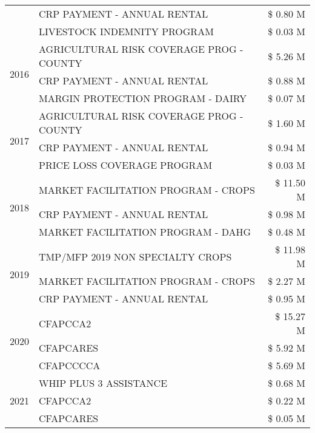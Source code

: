 \begin{tabular}{llr}
 & CRP PAYMENT - ANNUAL RENTAL & \$ 0.80 M \\
 & LIVESTOCK INDEMNITY PROGRAM & \$ 0.03 M \\
\cline{1-3}
\multirow[t]{3}{*}{2016} & AGRICULTURAL RISK COVERAGE PROG - COUNTY & \$ 5.26 M \\
 & CRP PAYMENT - ANNUAL RENTAL & \$ 0.88 M \\
 & MARGIN PROTECTION PROGRAM - DAIRY & \$ 0.07 M \\
\cline{1-3}
\multirow[t]{3}{*}{2017} & AGRICULTURAL RISK COVERAGE PROG - COUNTY & \$ 1.60 M \\
 & CRP PAYMENT - ANNUAL RENTAL & \$ 0.94 M \\
 & PRICE LOSS COVERAGE PROGRAM & \$ 0.03 M \\
\cline{1-3}
\multirow[t]{3}{*}{2018} & MARKET FACILITATION PROGRAM - CROPS & \$ 11.50 M \\
 & CRP PAYMENT - ANNUAL RENTAL & \$ 0.98 M \\
 & MARKET FACILITATION PROGRAM - DAHG & \$ 0.48 M \\
\cline{1-3}
\multirow[t]{3}{*}{2019} & TMP/MFP 2019 NON SPECIALTY CROPS & \$ 11.98 M \\
 & MARKET FACILITATION PROGRAM - CROPS & \$ 2.27 M \\
 & CRP PAYMENT - ANNUAL RENTAL & \$ 0.95 M \\
\cline{1-3}
\multirow[t]{3}{*}{2020} & CFAPCCA2 & \$ 15.27 M \\
 & CFAPCARES & \$ 5.92 M \\
 & CFAPCCCCA & \$ 5.69 M \\
\cline{1-3}
\multirow[t]{3}{*}{2021} & WHIP PLUS 3 ASSISTANCE & \$ 0.68 M \\
 & CFAPCCA2 & \$ 0.22 M \\
 & CFAPCARES & \$ 0.05 M \\
\cline{1-3}
\bottomrule
\end{tabular}
